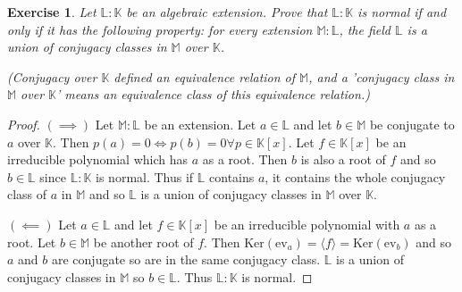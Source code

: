 \documentclass{article}
\newtheorem{exercise}[theorem]{Exercise}
\begin{document}
\begin{exercise}
Let $\mathbb{L}:\mathbb{K}$ be an algebraic extension. Prove that $\mathbb{L}:\mathbb{K}$ is normal if and only if it has the following property: for every extension $\mathbb{M}:\mathbb{L}$, the field $\mathbb{L}$ is a union of conjugacy classes in $\mathbb{M}$ over $\mathbb{K}$.

(Conjugacy over $\mathbb{K}$ defined an equivalence relation of $\mathbb{M}$, and a 'conjugacy class in $\mathbb{M}$ over $\mathbb{K}$' means an equivalence class of this equivalence relation.)
\end{exercise}
\begin{proof}
$(\implies)$ Let $\mathbb{M}:\mathbb{L}$ be an extension. Let $a\in\mathbb{L}$ and let $b\in\mathbb{M}$ be conjugate to $a$ over $\mathbb{K}$. Then $p(a)=0\iff p(b)=0\forall p\in\mathbb{K}[x]$. Let $f\in\mathbb{K}[x]$ be an irreducible polynomial which has $a$ as a root. Then $b$ is also a root of $f$ and so $b\in\mathbb{L}$ since $\mathbb{L}:\mathbb{K}$ is normal. Thus if $\mathbb{L}$ contains $a$, it contains the whole conjugacy class of $a$ in $\mathbb{M}$ and so $\mathbb{L}$ is a union of conjugacy classes in $\mathbb{M}$ over $\mathbb{K}$.

$(\impliedby)$ Let $a\in\mathbb{L}$ and let $f\in\mathbb{K}[x]$ be an irreducible polynomial with $a$ as a root. Let $b\in\mathbb{M}$ be another root of $f$. Then $\text{Ker}(\text{ev}_a)=\langle f\rangle=\text{Ker}(\text{ev}_b)$ and so $a$ and $b$ are conjugate so are in the same conjugacy class. $\mathbb{L}$ is a union of conjugacy classes in $\mathbb{M}$ so $b\in\mathbb{L}$. Thus $\mathbb{L}:\mathbb{K}$ is normal.
\end{proof}
\end{document}
